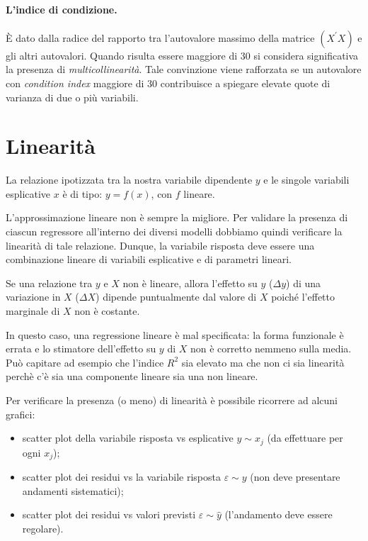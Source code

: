 \documentclass[a4page, 11pt]{article} %
\begin{document}
\paragraph{L'indice di condizione.} È dato dalla radice del rapporto tra l’autovalore massimo della matrice $(X^\prime X)$ e gli altri autovalori.
Quando risulta essere maggiore di $30$ si considera significativa la presenza di \textit{multicollinearità}.
Tale convinzione viene rafforzata se un autovalore con \textit{condition index} maggiore di $30$ contribuisce a spiegare elevate quote di varianza di due o più variabili.

\section{Linearità}
La relazione ipotizzata tra la nostra variabile dipendente $y$ e le singole variabili esplicative $x$ è di tipo: $y = f (x)$, con $f$ lineare.

L'approssimazione lineare non è sempre la migliore.
Per validare la presenza di ciascun regressore all’interno dei diversi modelli dobbiamo quindi verificare la linearità di tale relazione.
Dunque, la variabile risposta deve essere una combinazione lineare di variabili esplicative e di parametri lineari.

Se una relazione tra $y$ e $X$ non è lineare, allora l’effetto su $y$ ($\Delta y$)  di una variazione in $X$ ($\Delta X$) dipende puntualmente dal valore di $X$ poiché l’effetto marginale di $X$ non è costante. 

In questo caso, una regressione lineare è mal specificata: la forma funzionale è errata e lo stimatore dell’effetto su $y$ di $X$ non è corretto nemmeno sulla media. 
Può capitare ad esempio che l'indice $R^{2}$ sia elevato ma che non ci sia linearità perchè c'è sia una componente lineare sia una non lineare. 

Per verificare la presenza (o meno) di linearità è possibile ricorrere ad alcuni grafici: 
\begin{itemize}[noitemsep]
\item scatter plot della variabile risposta vs esplicative $y \sim x_j$ (da effettuare per ogni $x_j$);
\item scatter plot dei residui vs la variabile risposta $\varepsilon \sim y$ (non deve presentare andamenti sistematici);
  \item scatter plot dei residui vs valori previsti $\varepsilon \sim \hat{y}$ (l'andamento deve essere regolare).
\end{itemize}
  
\end{document}
